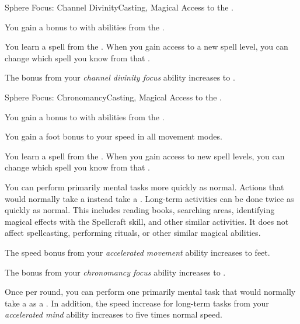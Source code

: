     \begin{feat}{Sphere Focus: Channel Divinity}{Casting, Magical}
        \featpre Access to the  .

         You gain a  bonus to  with abilities from the  .

         You learn a spell from the  .
        When you gain access to a new spell level, you can change which spell you know from that .

         The bonus from your \textit{channel divinity focus} ability increases to .
    \end{feat}

    \begin{feat}{Sphere Focus: Chronomancy}{Casting, Magical}
        \featpre Access to the  .

         You gain a  bonus to  with abilities from the  .

         You gain a  foot bonus to your speed in all movement modes.

         You learn a spell from the  .
        When you gain access to new spell levels, you can change which spell you know from that .

         You can perform primarily mental tasks more quickly as normal.
        Actions that would normally take a  instead take a .
        Long-term activities can be done twice as quickly as normal.
        This includes reading books, searching areas, identifying magical effects with the Spellcraft skill, and other similar activities.
        It does not affect spellcasting, performing rituals, or other similar magical abilities.

         The speed bonus from your \textit{accelerated movement} ability increases to  feet.

         The bonus from your \textit{chronomancy focus} ability increases to .

         Once per round, you can perform one primarily mental task that would normally take a  as a .
        In addition, the speed increase for long-term tasks from your \textit{accelerated mind} ability increases to five times normal speed.
    \end{feat}

